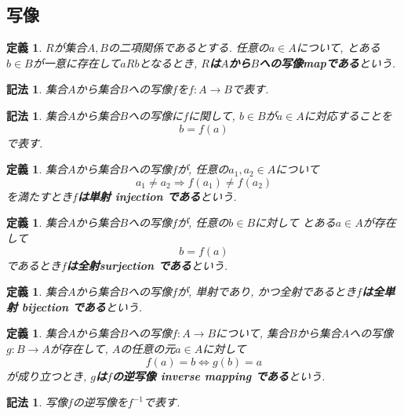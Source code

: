 \documentclass[dvipdfmx]{jsbook}
\theoremstyle{plain}
\newtheorem{Def}[thm]{定義}
\newtheorem{Notation}[thm]{記法}
\newtheorem{Prop}[thm]{命題}
\newtheorem{caution}[thm]{注意}
\begin{document}
\subsection{写像}
\begin{Def}
$R$が集合$A,B$の二項関係であるとする.
任意の$a\in A$について, とある$b\in B$が一意に存在して$aRb$となるとき,
{\bf $R$は$A$から$B$への写像mapである}という.
\end{Def}
\begin{Notation}
集合$A$から集合$B$への写像$f$を$f:A\rightarrow B$で表す.
\end{Notation}
\begin{comment}
\begin{caution}
以下では, 「{\bf 関数 function\index{かんすう@関数}}」と「写像」を同じ意味で用いる.
\end{caution}
\end{comment}
\begin{Notation}
集合$A$から集合$B$への写像に$f$に関して, $b\in B$が$a\in A$に対応することを
\[
b=f(a)
\]
で表す.
\end{Notation}
\begin{Def}
集合$A$から集合$B$への写像$f$が,
任意の$a_1,a_2\in A$について
\[
a_1\neq a_2\Rightarrow f(a_1)\neq f(a_2)
\]
を満たすとき{\bf $f$は単射 injection である}という.
\end{Def}
\begin{Def}
集合$A$から集合$B$への写像$f$が,
任意の$b\in B$に対して
とある$a\in A$が存在して
\[
b=f(a)
\]
であるとき{\bf $f$は全射surjection である}という.
\end{Def}
\begin{Def}
集合$A$から集合$B$への写像$f$が, 単射であり, かつ全射であるとき{\bf $f$は全単射 bijection である}という.
\end{Def}

\begin{Def}
集合$A$から集合$B$への写像$f:A\rightarrow B$について, 集合$B$から集合$A$への写像$g:B\rightarrow A$が存在して, $A$の任意の元$a\in A$に対して
\[
f(a)=b \Leftrightarrow g(b)=a
\]
が成り立つとき, {\bf $g$は$f$の逆写像 inverse mapping である}という.
\end{Def}
\begin{Notation}
写像$f$の逆写像を$f^{-1}$で表す.
\end{Notation}
\begin{comment}
************************************
\begin{Def}
$R$が集合$A,B$の二項関係であるとする.

任意の$a\in A$について$b,b'\in B$が存在し,
\[
aRb\land aRb'\Rightarrow b=b'
\]
が成り立つとき, {\bf $R$は$A$から$B$への部分関数\index{ぶぶんかんすう@部分関数}}という.\footnote{ここいらない気がする}
\end{Def}
\begin{Prop}
関数は部分関数である. これは定義より明らかである.
\end{Prop}
\begin{Prop}
部分関数は二項関係である. これは定義より明らかである.
\end{Prop}
************************************
\end{comment}
\end{document}
